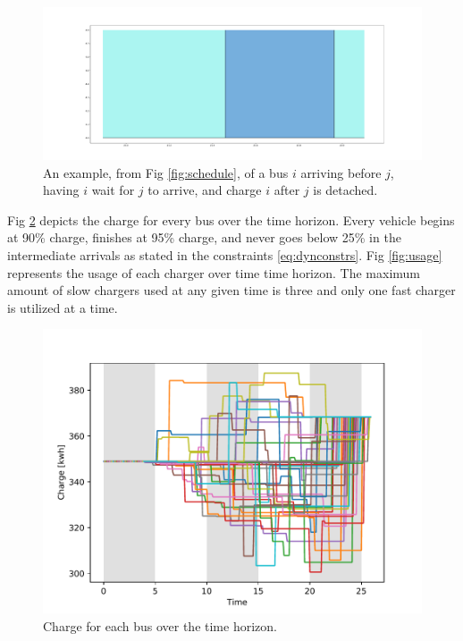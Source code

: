 \documentclass[letterpaper, 10pt, conference]{IEEEtran}
\begin{document}
\begin{figure}[ht]
	\centering
	\includegraphics[trim=0in 0in 0in 0in, width=\linewidth]{unoptimal.pdf}
	\caption{An example, from Fig \ref{fig:schedule}, of a bus $i$ arriving before $j$, having $i$ wait for $j$ to arrive, and charge $i$ after $j$ is detached.}
	\label{fig:unoptimal}
\end{figure}

Fig \ref{fig:charges} depicts the charge for every bus over the time horizon. Every vehicle begins at 90\% charge, finishes at 95\% charge, and never goes below 25\% in the intermediate arrivals as stated in the constraints \eqref{eq:dynconstrs}. Fig \ref{fig:usage} represents the usage of each charger over time time horizon. The maximum amount of slow chargers used at any given time is three and only one fast charger is utilized at a time.

\begin{figure}[ht]
	\centering
	\includegraphics[trim=0in 0in 0in 0in, width=\linewidth]{charges.pdf}
	\caption{Charge for each bus over the time horizon.}
	\label{fig:charges}
\end{figure}
\end{document}
